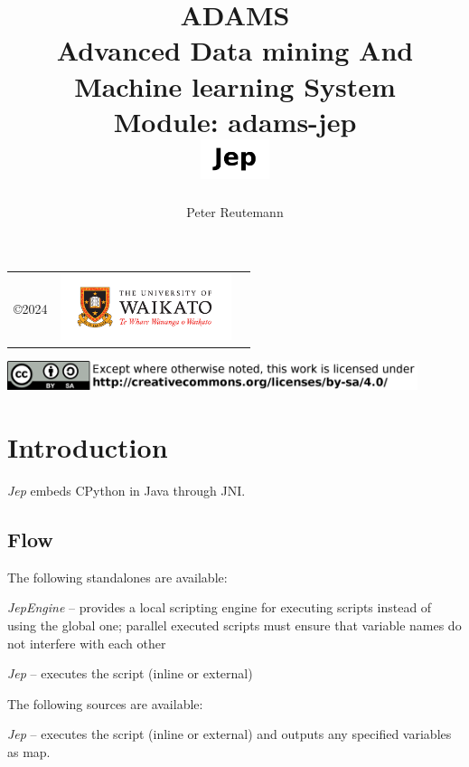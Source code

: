 \documentclass[a4paper]{book}
\title{
  \textbf{ADAMS} \\
  {\Large \textbf{A}dvanced \textbf{D}ata mining \textbf{A}nd \textbf{M}achine
  learning \textbf{S}ystem} \\
  {\Large Module: adams-jep} \\
  \vspace{1cm}
  \includegraphics[width=2cm]{images/jep-module.png} \\
}
\author{
  Peter Reutemann
}
\begin{document}
\begin{titlepage}
\maketitle

\thispagestyle{empty}
\center
\begin{table}[b]
	\begin{tabular}{c l l}
		\parbox[c][2cm]{2cm}{\copyright 2024} &
		\parbox[c][2cm]{5cm}{\includegraphics[width=5cm]{images/coat_of_arms.pdf}} \\
	\end{tabular}
	\includegraphics[width=12cm]{images/cc.png} \\
\end{table}

\end{titlepage}

\tableofcontents


\chapter{Introduction}
\textit{Jep} embeds CPython in Java through JNI\cite{jep}.

\section{Flow}
The following standalones are available:
\begin{tight_itemize}
	\item \textit{JepEngine} -- provides a local scripting engine for executing
	scripts instead of using the global one; parallel executed scripts must ensure
	that variable names do not interfere with each other
	\item \textit{Jep} -- executes the script (inline or external)
\end{tight_itemize}
The following sources are available:
\begin{tight_itemize}
	\item \textit{Jep} -- executes the script (inline or external) and outputs any specified variables as map.
\end{tight_itemize}
\end{document}

